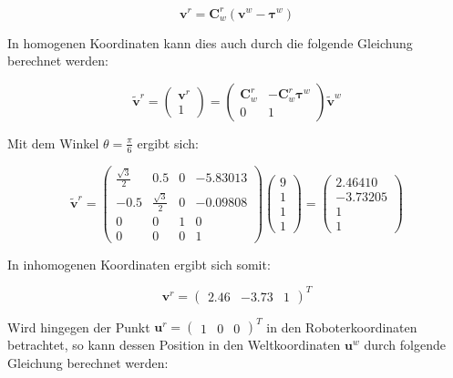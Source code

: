 \documentclass[12pt,a4paper]{report}
\begin{document}
\[
    \mathbf{v}^r = \mathbf{C}^r_w(\mathbf{v}^w - \boldsymbol{\tau}^w)
\]

In homogenen Koordinaten kann dies auch durch die folgende Gleichung berechnet werden:

\[
    \tilde{\mathbf{v}}^r =
    \begin{pmatrix}
        \mathbf{v}^r \\
        1
    \end{pmatrix}
    =
    \begin{pmatrix}
        \mathbf{C}^r_w & -\mathbf{C}^r_w\boldsymbol{\tau}^w \\
        0              & 1
    \end{pmatrix}
    \tilde{\mathbf{v}}^w
\]

Mit dem Winkel \(\theta = \frac{\pi}{6}\) ergibt sich:

\[
    \tilde{\mathbf{v}}^r = \begin{pmatrix}
        \frac{\sqrt{3}}{2} & 0.5                & 0 & -5.83013 \\
        -0.5               & \frac{\sqrt{3}}{2} & 0 & -0.09808 \\
        0                  & 0                  & 1 & 0        \\
        0                  & 0                  & 0 & 1
    \end{pmatrix}
    \begin{pmatrix}
        9 \\ 1 \\ 1 \\ 1
    \end{pmatrix}
    =
    \begin{pmatrix}
        2.46410 \\ -3.73205 \\ 1 \\ 1
    \end{pmatrix}
\]

In inhomogenen Koordinaten ergibt sich somit:

\[\mathbf{v}^r = \begin{pmatrix} 2.46 & -3.73 & 1 \end{pmatrix}^{T}\]

Wird hingegen der Punkt \(\mathbf{u}^r = \begin{pmatrix} 1 & 0 & 0 \end{pmatrix}^{T}\) in den Roboterkoordinaten betrachtet, so kann dessen Position in den Weltkoordinaten \(\mathbf{u}^w\) durch folgende Gleichung berechnet werden:
\end{document}
